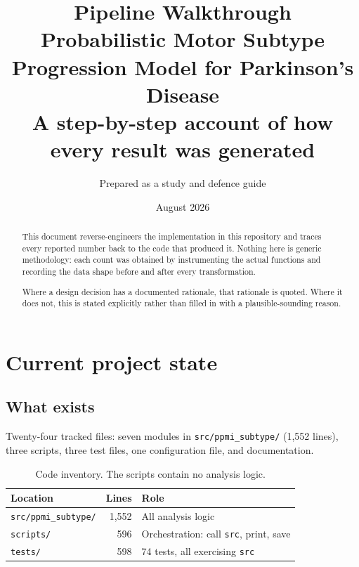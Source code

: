 \documentclass[11pt,a4paper]{article}
\title{\textbf{Pipeline Walkthrough}\\[0.4em]
       \large Probabilistic Motor Subtype Progression Model for Parkinson's Disease\\[0.6em]
       \normalsize A step-by-step account of how every result was generated}
\author{\small Prepared as a study and defence guide}
\date{August 2026}
\newcommand{\code}[1]{\texttt{\small #1}}
\begin{document}
\maketitle

\begin{abstract}
\noindent
This document reverse-engineers the implementation in this repository and
traces every reported number back to the code that produced it. Nothing here is
generic methodology: each count was obtained by instrumenting the actual
functions and recording the data shape before and after every transformation.

Where a design decision has a documented rationale, that rationale is quoted.
Where it does not, this is stated explicitly rather than filled in with a
plausible-sounding reason.
\end{abstract}

\tableofcontents
\clearpage

\section{Current project state}

\subsection{What exists}

Twenty-four tracked files: seven modules in \code{src/ppmi\_subtype/}
(1{,}552 lines), three scripts, three test files, one configuration file, and
documentation.

\begin{table}[h]
\centering
\begin{tabular}{@{}lrl@{}}
\toprule
\textbf{Location} & \textbf{Lines} & \textbf{Role} \\
\midrule
\code{src/ppmi\_subtype/} & 1{,}552 & All analysis logic \\
\code{scripts/}           &   596 & Orchestration: call \code{src}, print, save \\
\code{tests/}             &   598 & 74 tests, all exercising \code{src} \\
\bottomrule
\end{tabular}
\caption{Code inventory. The scripts contain no analysis logic.}
\end{table}
\end{document}
